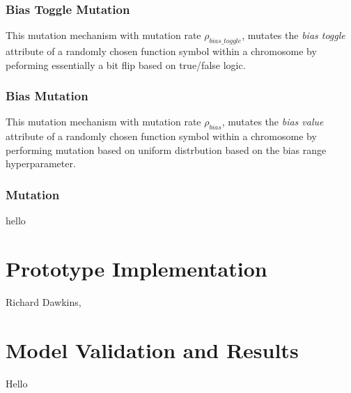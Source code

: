 \subsubsection{Bias Toggle Mutation}
This mutation mechanism with mutation rate $\rho_{bias\_toggle}$, mutates the \textit{bias toggle} attribute of a randomly chosen function symbol within a chromosome by peforming essentially a bit flip based on true/false logic.
	
\subsubsection{Bias Mutation}
This mutation mechanism with mutation rate $\rho_{bias}$, mutates the \textit{bias value} attribute of a randomly chosen function symbol within a chromosome by performing mutation based on uniform distrbution based on the bias range hyperparameter.

\subsubsection{Mutation}
hello


\section{Prototype Implementation}\label{sec:gep_neat_protoype_implementation}
Richard Dawkins, 


\section{Model Validation and Results}\label{sec:gep_neat_model_validation}
Hello